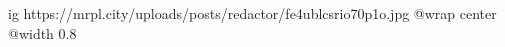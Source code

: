  
 
 
 
 

\ifcmt
  ig https://mrpl.city/uploads/posts/redactor/fe4ublcsrio70p1o.jpg
  @wrap center
  @width 0.8
\fi
